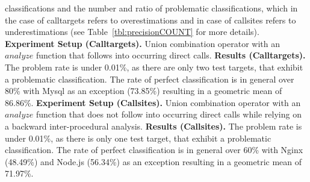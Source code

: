 classifications and the number and ratio of problematic classifications, 
which in the case of calltargets refers to overestimations and in case of callsites refers to underestimations (see Table~\ref{tbl:precisionCOUNT} for more details).
\textbf{Experiment Setup (Calltargets).} Union combination operator with an $analyze$ function that follows into occurring direct calls.
\textbf{Results (Calltargets).} The problem rate is under 0.01\%, as there are only two test targets, that exhibit a problematic classification. 
The rate of perfect classification is in general over 80\% with Mysql as an exception (73.85\%) resulting in a geometric mean of 86.86\%.
\textbf{Experiment Setup (Callsites).} Union combination operator with an $analyze$ function that does not follow into occurring direct calls
while relying on a backward inter-procedural analysis.
\textbf{Results (Callsites).} The problem rate is under 0.01\%, as there is only one test target, that exhibit a problematic classification.
The rate of perfect classification is in general over 60\% with Nginx (48.49\%) 
and Node.js (56.34\%) as an exception resulting in a geometric mean of 71.97\%.


